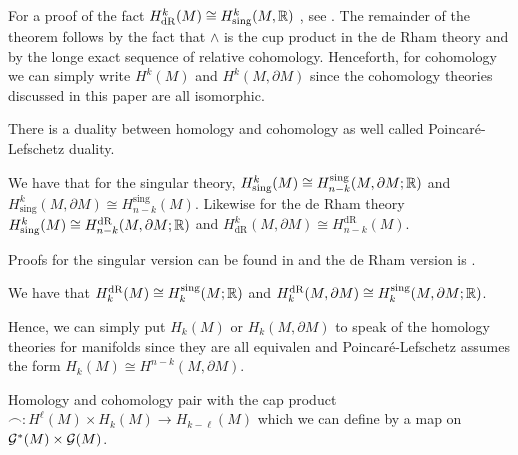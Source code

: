 \documentclass{article}
\begin{document}
For a proof of the fact $H^k_{\mathrm{dR}}(M) \cong H^k_{\textrm{sing}}(M,\mathbb{R})$ , see \cite[Pg. 584, Theorem 3]{giaquinta_cartesian_1998}. The remainder of the theorem follows by the fact that $\wedge$ is the cup product in the de Rham theory and by the longe exact sequence of relative cohomology. Henceforth, for cohomology we can simply write $H^k(M)$ and $H^k(M,\partial M)$ since the cohomology theories discussed in this paper are all isomorphic. 


There is a duality between homology and cohomology as well called Poincar\'e-Lefschetz duality.
\begin{theorem}
We have that for the singular theory, $H^k_{\mathrm{sing}}(M) \cong H_{n-k}^{\mathrm{sing}}(M,\partial M;\mathbb{R})$ and $H^k_{\mathrm{sing}}(M, \partial M) \cong H_{n-k}^{\textrm{sing}}(M)$. Likewise for the de Rham theory $H^k_{\mathrm{sing}}(M) \cong H_{n-k}^{\mathrm{dR}}(M,\partial M;\mathbb{R})$ and $H^k_{\mathrm{dR}}(M, \partial M) \cong H_{n-k}^{\textrm{dR}}(M)$.
\end{theorem}

Proofs for the singular version can be found in \cite{hatcher_algebraic_2002} and the de Rham version is \cite[pg. 582, Theorem 2]{giaquinta_cartesian_1998}.

\begin{corollary}
We have that $H_k^{\mathrm{dR}}(M) \cong H_k^{\mathrm{sing}}(M;\mathbb{R})$ and $H_k^{\mathrm{dR}}(M,\partial M) \cong H_k^{\mathrm{sing}}(M,\partial M;\mathbb{R})$.
\end{corollary}

Hence, we can simply put $H_k(M)$ or $H_k(M,\partial M)$ to speak of the homology theories for manifolds since they are all equivalen and Poincar\'e-Lefschetz assumes the form $H_k(M)\cong H^{n-k}(M,\partial M)$.

Homology and cohomology pair with the cap product $\frown \colon H^\ell(M) \times H_k(M) \to H_{k-\ell}(M)$ which we can define by a map on $\mathcal{G}^*(M)\times \mathcal{G}(M)$.
\end{document}
